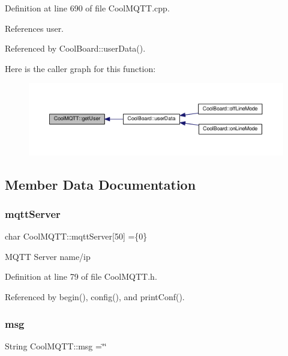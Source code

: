 Definition at line 690 of file Cool\+M\+Q\+T\+T.\+cpp.



References user.



Referenced by Cool\+Board\+::user\+Data().

Here is the caller graph for this function\+:\nopagebreak
\begin{figure}[H]
\begin{center}
\leavevmode
\includegraphics[width=350pt]{d0/dd0/class_cool_m_q_t_t_a373cc92fca7760d886f02d8a6e5b3f63_icgraph}
\end{center}
\end{figure}


\subsection{Member Data Documentation}
\mbox{\label{class_cool_m_q_t_t_ab8bb951f87ddbf92db74c2ad16a3e53e}} 
\subsubsection{\texorpdfstring{mqtt\+Server}{mqttServer}}
{\footnotesize\ttfamily char Cool\+M\+Q\+T\+T\+::mqtt\+Server\mbox{[}50\mbox{]} =\{\textquotesingle{}0\textquotesingle{}\}\hspace{0.3cm}{\ttfamily [private]}}

M\+Q\+TT Server name/ip 

Definition at line 79 of file Cool\+M\+Q\+T\+T.\+h.



Referenced by begin(), config(), and print\+Conf().

\mbox{\label{class_cool_m_q_t_t_af6b19e7074dbbb4ae493c44dcb53f7ff}} 
\subsubsection{\texorpdfstring{msg}{msg}}
{\footnotesize\ttfamily String Cool\+M\+Q\+T\+T\+::msg =\char`\"{}\char`\"{}\hspace{0.3cm}{\ttfamily [private]}}

